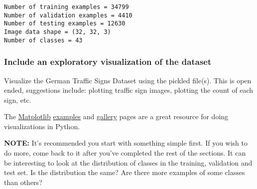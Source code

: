 \documentclass[11pt]{article}
\begin{document}
    \begin{Verbatim}[commandchars=\\\{\}]
Number of training examples = 34799
Number of validation examples = 4410
Number of testing examples = 12630
Image data shape = (32, 32, 3)
Number of classes = 43

    \end{Verbatim}

    \hypertarget{include-an-exploratory-visualization-of-the-dataset}{%
\subsubsection{Include an exploratory visualization of the
dataset}\label{include-an-exploratory-visualization-of-the-dataset}}

    Visualize the German Traffic Signs Dataset using the pickled file(s).
This is open ended, suggestions include: plotting traffic sign images,
plotting the count of each sign, etc.

The \href{http://matplotlib.org/}{Matplotlib}
\href{http://matplotlib.org/examples/index.html}{examples} and
\href{http://matplotlib.org/gallery.html}{gallery} pages are a great
resource for doing visualizations in Python.

\textbf{NOTE:} It's recommended you start with something simple first.
If you wish to do more, come back to it after you've completed the rest
of the sections. It can be interesting to look at the distribution of
classes in the training, validation and test set. Is the distribution
the same? Are there more examples of some classes than others?
\end{document}
